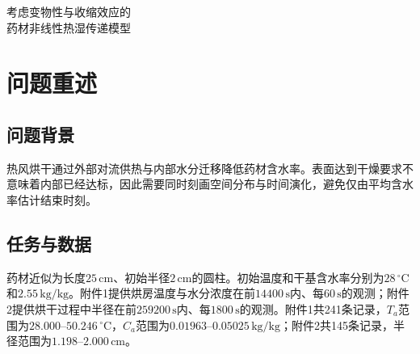 \documentclass[UTF8,zihao=-4,a4paper]{ctexart}
\newcommand{\keywords}[1]{\par\noindent\textbf{关键词：}#1}
\begin{document}
\pagestyle{plain}\songti{}\sloppy
\begin{center}\titlefont{}考虑变物性与收缩效应的\\药材非线性热湿传递模型\end{center}

\begin{abstract}
药材热风干燥存在表面失水快、内部响应滞后及后期传质受限等现象，仅用平均含水率难以判断全域是否达标。针对圆柱形药材，本文以温度和干基含水率为状态，建立变物性径向热湿传递模型，并在收缩条件下采用归一化材料坐标统一描述计算域。

针对问题1，使用题给预热物性及环境观测构造对流边界，采用圆环有限体积法求解温湿分布。1800秒时中心与表面温度分别为33.5753和36.7856摄氏度，表面含水率降至1.5103千克/千克，中心仍接近初值，体现出明显的径向传递滞后。

针对问题2和问题3，将附录3经验物性纳入全程模型，以浓度区间积分计算非线性界面扩散系数，并通过表面加密网格和隐式迭代解析低含水率层。以全域最大含水率低于0.15千克/千克为判据，得到固定半径条件下的报告干燥时长为57.1696小时；同时给出前3小时代表性剖面以及全过程逐秒结果。

针对问题4，引入实测半径变化和附录4物性，得到报告干燥时长50.8244小时、终点半径1.2000厘米。采用当前物理半径重构固定距离结果，避免将域外空值误作零含水率。两问同时改变物性与几何，时长差不能全部归因于收缩。

通过容差收紧、独立离散程序对照及边界系数情景扫描检验实现。时间容差收紧后，两问报告终点差不超过0.0146秒；在给定离散情景内，传质系数扰动对时长的影响大于换热系数扰动。上述检验不替代物理标定：4小时后的环境延拓、有效气固浓度映射及潜热省略仍限制预测精度。模型可用于给定工况下的温湿分布分析与条件性干燥时间估算。

\keywords{圆柱径向扩散；变物性；区间积分通量；移动坐标；有限体积；全域达标}
\end{abstract}
\clearpage

\section{问题重述}
\subsection{问题背景}
热风烘干通过外部对流供热与内部水分迁移降低药材含水率。表面达到干燥要求不意味着内部已经达标，因此需要同时刻画空间分布与时间演化，避免仅由平均含水率估计结束时刻。
\subsection{任务与数据}
药材近似为长度$25\,\mathrm{cm}$、初始半径$2\,\mathrm{cm}$的圆柱。初始温度和干基含水率分别为$28\,^{\circ}\mathrm C$和$2.55\,\mathrm{kg/kg}$。附件1提供烘房温度与水分浓度在前$14400\,\mathrm s$内、每$60\,\mathrm s$的观测；附件2提供烘干过程中半径在前$259200\,\mathrm s$内、每$1800\,\mathrm s$的观测。附件1共241条记录，$T_a$范围为$28.000$--$50.246\,^{\circ}\mathrm C$，$C_a$范围为$0.01963$--$0.05025\,\mathrm{kg/kg}$；附件2共145条记录，半径范围为$1.198$--$2.000\,\mathrm{cm}$。
\end{document}
